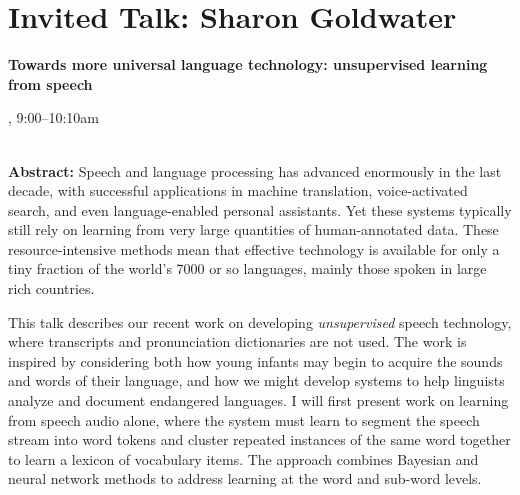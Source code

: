 \section{Invited Talk: Sharon Goldwater}

\begin{center}
\begin{Large}
{\bfseries\Large Towards more universal language technology: unsupervised learning from speech}\vspace{1em}\par
\end{Large}


\daydateyear, 9:00--10:10am \vspace{1em}\\
\PlenaryLoc \\
\vspace{1em}\par
\end{center}

\noindent
{\bfseries Abstract:} Speech and language processing has advanced enormously in the last
        decade, with successful applications in machine translation,
        voice-activated search, and even language-enabled personal
        assistants. Yet these systems typically still rely on learning from
        very large quantities of human-annotated data. These
        resource-intensive methods mean that effective technology is available
        for only a tiny fraction of the world's 7000 or so languages, mainly
        those spoken in large rich countries.
        
        This talk describes our recent work on developing \textit{unsupervised}
        speech technology, where transcripts and pronunciation dictionaries
        are not used. The work is inspired by considering both how young
        infants may begin to acquire the sounds and words of their language,
        and how we might develop systems to help linguists analyze and
        document endangered languages. I will first present work on learning
        from speech audio alone, where the system must learn to segment the
        speech stream into word tokens and cluster repeated instances of the
        same word together to learn a lexicon of vocabulary items. The
        approach combines Bayesian and neural network methods to address
        learning at the word and sub-word levels.


